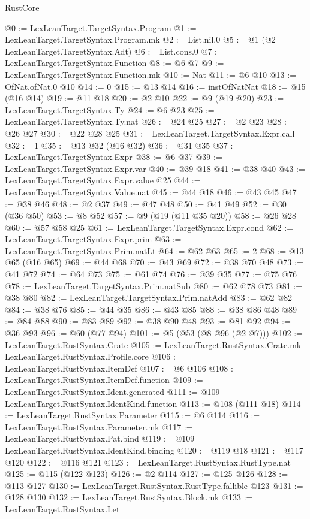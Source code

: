 \begin{lexlean}{RustCore}
\begin{coremodule}
{\begin{coremodule}
{{{{{{@0 := LexLeanTarget.TargetSyntax.Program
@1 := LexLeanTarget.TargetSyntax.Program.mk
@2 := List.nil.{0}
@5 := @1 (@2 LexLeanTarget.TargetSyntax.Adt)
@6 := List.cons.{0}
@7 := LexLeanTarget.TargetSyntax.Function
@8 := @6 @7
@9 := LexLeanTarget.TargetSyntax.Function.mk
@10 := Nat
@11 := @6 @10
@13 := OfNat.ofNat.{0} @10
@14 := 0
@15 := @13 @14
@16 := instOfNatNat
@18 := @15 (@16 @14)
@19 := @11 @18
@20 := @2 @10
@22 := @9 (@19 @20)
@23 := LexLeanTarget.TargetSyntax.Ty
@24 := @6 @23
@25 := LexLeanTarget.TargetSyntax.Ty.nat
@26 := @24 @25
@27 := @2 @23
@28 := @26 @27
@30 := @22 @28 @25
@31 := LexLeanTarget.TargetSyntax.Expr.call
@32 := 1
@35 := @13 @32 (@16 @32)
@36 := @31 @35
@37 := LexLeanTarget.TargetSyntax.Expr
@38 := @6 @37
@39 := LexLeanTarget.TargetSyntax.Expr.var
@40 := @39 @18
@41 := @38 @40
@43 := LexLeanTarget.TargetSyntax.Expr.value @25
@44 := LexLeanTarget.TargetSyntax.Value.nat
@45 := @44 @18
@46 := @43 @45
@47 := @38 @46
@48 := @2 @37
@49 := @47 @48
@50 := @41 @49
@52 := @30 (@36 @50)
@53 := @8 @52
@57 := @9 (@19 (@11 @35 @20))
@58 := @26 @28
@60 := @57 @58 @25
@61 := LexLeanTarget.TargetSyntax.Expr.cond
@62 := LexLeanTarget.TargetSyntax.Expr.prim
@63 := LexLeanTarget.TargetSyntax.Prim.natLt
@64 := @62 @63
@65 := 2
@68 := @13 @65 (@16 @65)
@69 := @44 @68
@70 := @43 @69
@72 := @38 @70 @48
@73 := @41 @72
@74 := @64 @73
@75 := @61 @74
@76 := @39 @35
@77 := @75 @76
@78 := LexLeanTarget.TargetSyntax.Prim.natSub
@80 := @62 @78 @73
@81 := @38 @80
@82 := LexLeanTarget.TargetSyntax.Prim.natAdd
@83 := @62 @82
@84 := @38 @76
@85 := @44 @35
@86 := @43 @85
@88 := @38 @86 @48
@89 := @84 @88
@90 := @83 @89
@92 := @38 @90 @48
@93 := @81 @92
@94 := @36 @93
@96 := @60 (@77 @94)
@101 := @5 (@53 (@8 @96 (@2 @7)))
@102 := LexLeanTarget.RustSyntax.Crate
@105 := LexLeanTarget.RustSyntax.Crate.mk LexLeanTarget.RustSyntax.Profile.core
@106 := LexLeanTarget.RustSyntax.ItemDef
@107 := @6 @106
@108 := LexLeanTarget.RustSyntax.ItemDef.function
@109 := LexLeanTarget.RustSyntax.Ident.generated
@111 := @109 LexLeanTarget.RustSyntax.IdentKind.function
@113 := @108 (@111 @18)
@114 := LexLeanTarget.RustSyntax.Parameter
@115 := @6 @114
@116 := LexLeanTarget.RustSyntax.Parameter.mk
@117 := LexLeanTarget.RustSyntax.Pat.bind
@119 := @109 LexLeanTarget.RustSyntax.IdentKind.binding
@120 := @119 @18
@121 := @117 @120
@122 := @116 @121
@123 := LexLeanTarget.RustSyntax.RustType.nat
@125 := @115 (@122 @123)
@126 := @2 @114
@127 := @125 @126
@128 := @113 @127
@130 := LexLeanTarget.RustSyntax.RustType.fallible @123
@131 := @128 @130
@132 := LexLeanTarget.RustSyntax.Block.mk
@133 := LexLeanTarget.RustSyntax.Let
}}}}}}
\end{coremodule}}
\end{coremodule}
\end{lexlean}
